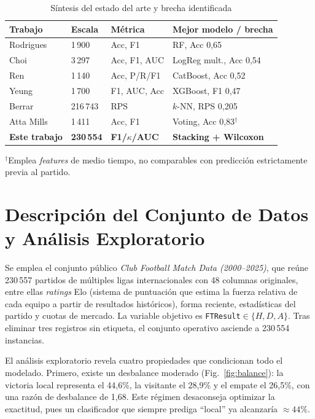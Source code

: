 \documentclass[conference]{IEEEtran}
\begin{document}
\begin{table}[t]
\caption{S\'intesis del estado del arte y brecha identificada}
\label{tab:gap}
\centering
\footnotesize
\begin{tabular}{@{}p{1.5cm}p{1.1cm}p{1.5cm}p{2.5cm}@{}}
\toprule
\textbf{Trabajo} & \textbf{Escala} & \textbf{M\'etrica} & \textbf{Mejor modelo / brecha} \\
\midrule
Rodrigues \cite{rodrigues2022} & 1\,900 & Acc, F1 & RF, Acc 0,65 \\
Choi \cite{choi2023} & 3\,297 & Acc, F1, AUC & LogReg mult., Acc 0,54 \\
Ren \cite{ren2022} & 1\,140 & Acc, P/R/F1 & CatBoost, Acc 0,52 \\
Yeung \cite{yeung2023} & 1\,700 & F1, AUC, Acc & XGBoost, F1 0,47 \\
Berrar \cite{berrar2019} & 216\,743 & RPS & $k$-NN, RPS 0,205 \\
Atta Mills \cite{attamills2024} & 1\,411 & Acc, F1 & Voting, Acc 0,83$^{\dagger}$ \\
\midrule
\textbf{Este trabajo} & \textbf{230\,554} & \textbf{F1/$\kappa$/AUC} & \textbf{Stacking + Wilcoxon} \\
\bottomrule
\end{tabular}

\vspace{3pt}
{\footnotesize\raggedright $^{\dagger}$Emplea \emph{features} de medio tiempo, no
comparables con predicci\'on estrictamente previa al partido.\par}
\end{table}

\section{Descripci\'on del Conjunto de Datos y An\'alisis Exploratorio}\label{sec:dataset}
Se emplea el conjunto p\'ublico \emph{Club Football Match Data (2000--2025)}, que re\'une
230\,557 partidos de m\'ultiples ligas internacionales con 48 columnas originales, entre
ellas \emph{ratings} Elo (sistema de puntuaci\'on que estima la fuerza relativa de cada
equipo a partir de resultados hist\'oricos), forma reciente, estad\'isticas del partido y
cuotas de mercado. La variable objetivo es \texttt{FTResult}$\in\{H,D,A\}$. Tras eliminar
tres registros sin etiqueta, el conjunto operativo asciende a 230\,554 instancias.

El an\'alisis exploratorio revela cuatro propiedades que condicionan todo el modelado.
Primero, existe un desbalance moderado (Fig.~\ref{fig:balance}): la victoria local
representa el 44,6\%, la visitante el 28,9\% y el empate el 26,5\%, con una raz\'on de
desbalance de 1,68. Este r\'egimen desaconseja optimizar la exactitud, pues un clasificador
que siempre prediga ``local'' ya alcanzar\'ia $\approx 44\%$.
\end{document}
